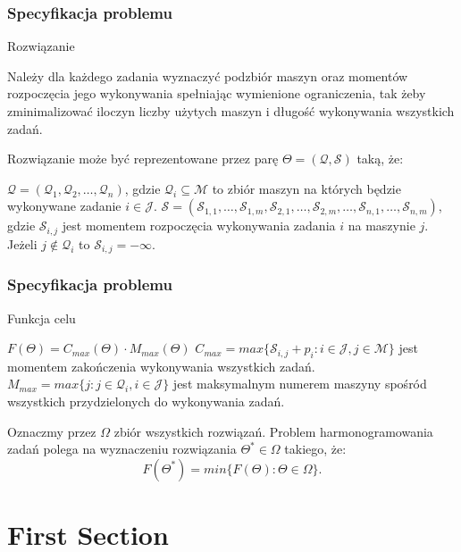 \documentclass{beamer}
\begin{document}
\begin{frame}
    \frametitle{Specyfikacja problemu}
    Rozwiązanie
    \begin{outline}
        \1 Należy dla każdego zadania wyznaczyć podzbiór maszyn oraz momentów rozpoczęcia jego wykonywania spełniając wymienione ograniczenia, tak żeby zminimalizować iloczyn liczby
        użytych maszyn i długość wykonywania wszystkich zadań.
    \end{outline}
    
    
    Rozwiązanie może być reprezentowane przez parę $\Theta=(\mathcal{Q},\mathcal{S})$ taką, że:
    \begin{outline}
        \1 $\mathcal{Q}=(\mathcal{Q}_1,\mathcal{Q}_2,\dots,\mathcal{Q}_n)$, gdzie 
        $\mathcal{Q}_i \subseteq \mathcal{M}$
        to zbiór maszyn na których będzie wykonywane zadanie $i\in\mathcal{J}$.
        \1 $\mathcal{S}=(\mathcal{S}_{1,1},\dots,\mathcal{S}_{1,m},\mathcal{S}_{2,1},
        \dots,\mathcal{S}_{2,m},\dots,\mathcal{S}_{n,1},\dots,\mathcal{S}_{n,m})$, gdzie
        $\mathcal{S}_{i,j}$ jest momentem rozpoczęcia wykonywania zadania $i$ na maszynie $j$.
        Jeżeli $j\notin\mathcal{Q}_i$ to $\mathcal{S}_{i,j}=-\infty$.
    \end{outline}
    
\end{frame}

\begin{frame}
    \frametitle{Specyfikacja problemu}
    Funkcja celu
    \begin{outline}
        \1 $F(\Theta)=C_{max}(\Theta)\cdot M_{max}(\Theta)$
        \1 $C_{max}=max\{\mathcal{S}_{i,j}+p_i: i\in\mathcal{J}, j\in\mathcal{M}\}$
        jest momentem zakończenia wykonywania wszystkich zadań.
        \1 $M_{max}=max\{j:j\in\mathcal{Q}_i,i\in\mathcal{J}\}$
        jest maksymalnym numerem maszyny spośród wszystkich przydzielonych 
        do wykonywania zadań.
    \end{outline}
    
    Oznaczmy przez $\Omega$ zbiór wszystkich rozwiązań.
    Problem harmonogramowania zadań polega na wyznaczeniu rozwiązania $\Theta^*\in\Omega$
    takiego, że:
    $$F(\Theta^*)=min\{F(\Theta):\Theta\in\Omega\}.$$
\end{frame}

\section{First Section} %
\end{document}
